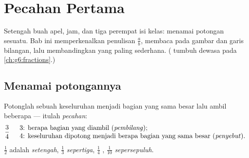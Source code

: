 \chapter{Pecahan Pertama}\label{ch:g4:fractions}

Setengah buah apel,  jam, dan tiga perempat isi kelas:
menamai potongan sesuatu. Bab ini memperkenalkan penulisan
$\frac{a}{b}$, membaca  pada gambar dan garis bilangan, lalu
membandingkan  yang paling sederhana. ( tumbuh dewasa
pada \cref{ch:g6:fractions}.)

\section{Menamai potongannya}

\begin{definition}[Pecahan]\label{def:g4:fractions:def}
Potonglah sebuah keseluruhan menjadi bagian yang sama besar lalu
ambil beberapa --- itulah \emph{pecahan}:
\[
\frac{3}{4}
\quad
\begin{array}{l}
3 \text{: berapa bagian yang diambil (\emph{pembilang}\index{pembilang});}\\
4 \text{: keseluruhan dipotong menjadi berapa bagian yang sama besar
(\emph{penyebut}\index{penyebut}).}
\end{array}
\]
$\frac12$ adalah \emph{setengah}, $\frac13$ \emph{sepertiga},
$\frac14$ \emph{}, $\frac{1}{10}$ \emph{sepersepuluh}.
\end{definition}

